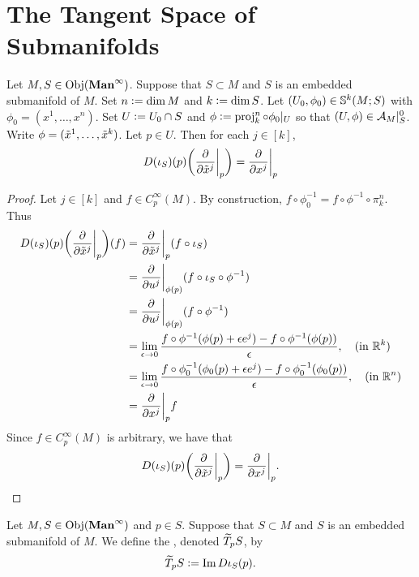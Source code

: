 \documentclass{book}
\begin{document}
	
	
	
	\newpage
	\section{The Tangent Space of Submanifolds}
	
	\begin{ex} 
		Let $M, S \in \Obj(\Maninf)$. Suppose that $S \subset M$ and $S$ is an embedded submanifold of $M$. Set $n \defeq \dim M$ and $k \defeq \dim S$. Let $(U_0, \phi_0) \in \S^k(M;S)$ with $\phi_0 = (x^1, \ldots, x^n)$. Set $U \defeq U_0 \cap S$ and $\phi \defeq \prj^n_k \circ \phi_0|_U$ so that $(U, \phi) \in \MA_M|_S^0$. Write $\phi = (\tl{x}^1, \ldots, \tl{x}^k)$. Let $p \in U$. Then for each $j \in [k]$, 
		$$D(\iota_S)(p)\bigg(\frac{\p }{\p \tl{x}^j}\bigg|_p \bigg) = \frac{\p }{\p x^j} \bigg|_p$$
	\end{ex}

	\begin{proof}
		Let $j \in [k]$ and $f \in C^{\infty}_p(M)$. By construction, $f \circ \phi_0^{-1} = f \circ \phi^{-1} \circ \pi^n_k$. Thus
		\begin{align*}
			D(\iota_S)(p)\bigg(\frac{\p }{\p \tl{x}^j}\bigg|_p \bigg) (f)
			& = \frac{\p }{\p \tl{x}^j}\bigg|_p(f \circ \iota_S) \\
			& = \frac{\p }{\p u^j}\bigg|_{\phi(p)} (f \circ \iota_S \circ \phi^{-1} ) \\
			& = \frac{\p }{\p u^j}\bigg|_{\phi(p)} (f \circ \phi^{-1} ) \\
			& = \lim_{\ep \rightarrow 0} \frac{f \circ \phi^{-1}(\phi(p) + \ep e^j) - f \circ \phi^{-1}(\phi(p)) }{ \ep} , \quad \text{(in $\R^k$)} \\
			& = \lim_{\ep \rightarrow 0} \frac{f \circ \phi_0^{-1}(\phi_0(p) + \ep e^j) - f \circ \phi_0^{-1}(\phi_0(p)) }{ \ep} , \quad \text{(in $\R^n$)}  \\
			& = \frac{\p }{\p x ^j} \bigg|_p f
		\end{align*}
		Since $f \in C^{\infty}_p(M)$ is arbitrary, we have that 
		$$D(\iota_S)(p)\bigg(\frac{\p }{\p \tl{x}^j}\bigg|_p \bigg) = \frac{\p }{\p x ^j} \bigg|_p.$$
	\end{proof}

	\begin{defn}
		Let $M, S \in \Obj(\Maninf)$ and $p \in S$. Suppose that $S \subset M$ and $S$ is an embedded submanifold of $M$. We define the , denoted $\wt{T}_p S$, by 
		$$\wt{T}_p S \defeq \Im D \iota_S(p).$$
	\end{defn}
\end{document}
